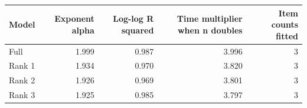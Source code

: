 \begin{tabular}{lrrrr}
\toprule
Model & Exponent alpha & Log-log R squared & Time multiplier when n doubles & Item counts fitted \\
\midrule
Full & 1.999 & 0.987 & 3.996 & 3 \\
Rank 1 & 1.934 & 0.970 & 3.820 & 3 \\
Rank 2 & 1.926 & 0.969 & 3.801 & 3 \\
Rank 3 & 1.925 & 0.985 & 3.797 & 3 \\
\bottomrule
\end{tabular}
